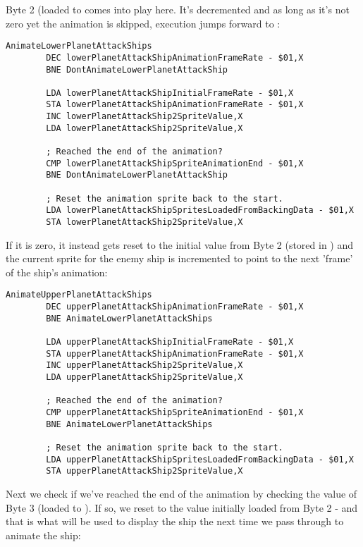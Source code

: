 Byte 2 (loaded to  comes into play here. It's decremented and as long as it's
not zero yet the animation is skipped, execution jumps forward to :

\begin{lstlisting}
AnimateLowerPlanetAttackShips   
        DEC lowerPlanetAttackShipAnimationFrameRate - $01,X
        BNE DontAnimateLowerPlanetAttackShip

        LDA lowerPlanetAttackShipInitialFrameRate - $01,X
        STA lowerPlanetAttackShipAnimationFrameRate - $01,X
        INC lowerPlanetAttackShip2SpriteValue,X
        LDA lowerPlanetAttackShip2SpriteValue,X

        ; Reached the end of the animation?
        CMP lowerPlanetAttackShipSpriteAnimationEnd - $01,X
        BNE DontAnimateLowerPlanetAttackShip

        ; Reset the animation sprite back to the start.
        LDA lowerPlanetAttackShipSpritesLoadedFromBackingData - $01,X
        STA lowerPlanetAttackShip2SpriteValue,X
\end{lstlisting}

If it is zero, it instead gets reset to the initial value from Byte 2 (stored in
 )
and the current sprite for the enemy ship is incremented to point to the next 'frame' of the ship's animation:

\begin{lstlisting}
AnimateUpperPlanetAttackShips   
        DEC upperPlanetAttackShipAnimationFrameRate - $01,X
        BNE AnimateLowerPlanetAttackShips

        LDA upperPlanetAttackShipInitialFrameRate - $01,X
        STA upperPlanetAttackShipAnimationFrameRate - $01,X
        INC upperPlanetAttackShip2SpriteValue,X
        LDA upperPlanetAttackShip2SpriteValue,X

        ; Reached the end of the animation?
        CMP upperPlanetAttackShipSpriteAnimationEnd - $01,X
        BNE AnimateLowerPlanetAttackShips

        ; Reset the animation sprite back to the start.
        LDA upperPlanetAttackShipSpritesLoadedFromBackingData - $01,X
        STA upperPlanetAttackShip2SpriteValue,X
\end{lstlisting}

Next we check if we've reached the end of the animation by checking the value
of Byte 3 (loaded to ).  If so,
we reset  to the value initially
loaded from Byte 2 - and that is what will be used to display the ship the next
time we pass through to animate the ship:

